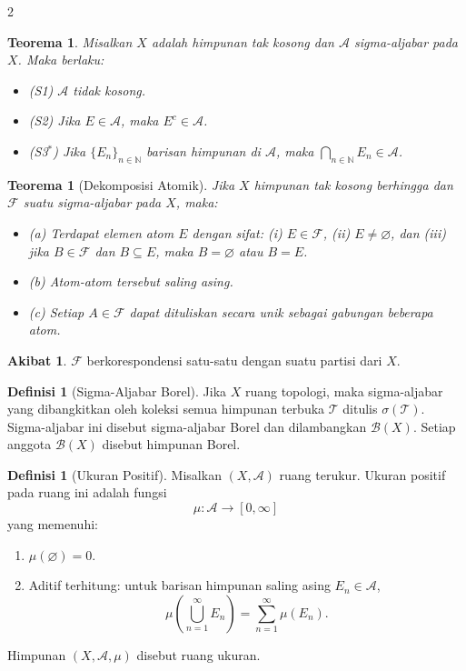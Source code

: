 \documentclass[a4paper,extrafontsizes, 9pt]{memoir}
\theoremstyle{definition}
\newtheorem{definisi}[kalstok]{Definisi}
\newtheorem{akibat}[kalstok]{Akibat}
\theoremstyle{plain}
\newtheorem{teorema}[kalstok]{Teorema}
\theoremstyle{remark}
\begin{document}
\begin{multicols}{2}
  \begin{teorema}
    Misalkan $X$ adalah himpunan tak kosong dan $\mathcal{A}$ sigma-aljabar pada $X$. Maka berlaku:
    \begin{itemize}[leftmargin=*, itemsep=0.5mm]
      \item (S1) $\mathcal{A}$ tidak kosong.
      \item (S2) Jika $E\in\mathcal{A}$, maka $E^c\in\mathcal{A}$.
      \item (S3$^*$) Jika $\{E_n\}_{n\in\mathbb{N}}$ barisan himpunan di $\mathcal{A}$, maka $\displaystyle\bigcap_{n\in\mathbb{N}}E_n\in\mathcal{A}$.
    \end{itemize}
  \end{teorema}

  \begin{teorema}[Dekomposisi Atomik]
    Jika $X$ himpunan tak kosong berhingga dan $\mathcal{F}$ suatu sigma-aljabar pada $X$, maka:
    \begin{itemize}[leftmargin=*, itemsep=0.5mm]
      \item (a) Terdapat elemen atom $E$ dengan sifat: (i) $E\in\mathcal{F}$, (ii) $E\neq\varnothing$, dan (iii) jika $B\in\mathcal{F}$ dan $B\subseteq E$, maka $B=\varnothing$ atau $B=E$.
      \item (b) Atom-atom tersebut saling asing.
      \item (c) Setiap $A\in\mathcal{F}$ dapat dituliskan secara unik sebagai gabungan beberapa atom.
    \end{itemize}
  \end{teorema}

  \begin{akibat}
    $\mathcal{F}$ berkorespondensi satu-satu dengan suatu partisi dari $X$.
  \end{akibat}

  \begin{definisi}[Sigma-Aljabar Borel]
    Jika $X$ ruang topologi, maka sigma-aljabar yang dibangkitkan oleh koleksi semua himpunan terbuka $\mathcal{T}$ ditulis $\sigma(\mathcal{T})$.
    Sigma-aljabar ini disebut sigma-aljabar Borel dan dilambangkan $\mathcal{B}(X)$. Setiap anggota $\mathcal{B}(X)$ disebut himpunan Borel.
  \end{definisi}

  \begin{definisi}[Ukuran Positif]
    Misalkan $(X,\mathcal{A})$ ruang terukur. Ukuran positif pada ruang ini adalah fungsi
    \[\mu:\mathcal{A}\to[0,\infty]\]
    yang memenuhi:
    \begin{enumerate}[leftmargin=*, itemsep=0.5mm]
      \item $\mu(\varnothing)=0$.
      \item Aditif terhitung: untuk barisan himpunan saling asing $E_n\in\mathcal{A}$,
            \[\mu\!\left(\bigcup_{n=1}^{\infty}E_n\right)=\sum_{n=1}^{\infty}\mu(E_n).\]
    \end{enumerate}
    Himpunan $(X,\mathcal{A},\mu)$ disebut ruang ukuran.
  \end{definisi}


\end{multicols}
\end{document}
